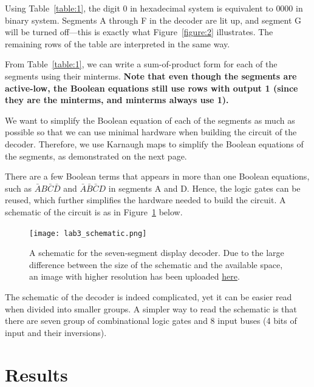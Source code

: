 \documentclass[12pt]{article}
\begin{document}
Using Table~\ref{table:1}, the digit $0$ in hexadecimal system is equivalent to $0000$ in binary system. Segments A through F in the decoder are lit up, and segment G will be turned off---this is exactly what Figure~\ref{figure:2} illustrates. The remaining rows of the table are interpreted in the same way.

From Table~\ref{table:1}, we can write a sum-of-product form for each of the segments using their minterms. \textbf{Note that even though the segments are active-low, the Boolean equations still use rows with output 1 (since they are the minterms, and minterms always use 1).}

We want to simplify the Boolean equation of each of the segments as much as possible so that we can use minimal hardware when building the circuit of the decoder. Therefore, we use Karnaugh maps to simplify the Boolean equations of the segments, as demonstrated on the next page.



There are a few Boolean terms that appears in more than one Boolean equations, such as $\bar{A}B\bar{C}\bar{D}$ and $\bar{A}\bar{B}\bar{C}D$ in segments A and D. Hence, the logic gates can be reused, which further simplifies the hardware needed to build the circuit. A schematic of the circuit is as in Figure~\ref{figure:4} below.

\begin{figure}[ht]
  \centering
  \texttt{[image: lab3\_schematic.png]}
  \caption{A schematic for the seven-segment display decoder. Due to the large difference between the size of the schematic and the available space, an image with higher resolution has been uploaded \href{https://i.imgur.com/jaLoZg9.jpg}{here}.}
  \label{figure:4}
\end{figure}

The schematic of the decoder is indeed complicated, yet it can be easier read when divided into smaller groups. A simpler way to read the schematic is that there are seven group of combinational logic gates and 8 input buses (4 bits of input and their inversions).

\section{Results}
\end{document}
